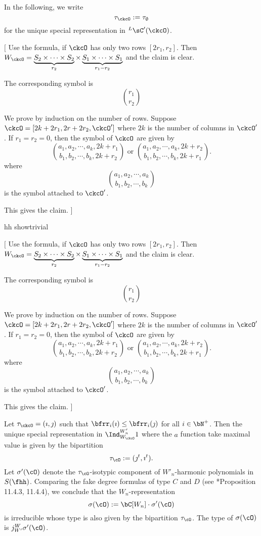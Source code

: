 \documentclass[12pt,a4paper]{amsart}
\newcommand{\trivial}[2][]{\if\relax\detokenize{#1}\relax
  {%
      \color{orange} \vspace{0em} $[$  #2 $]$
      \color{black}
  }
  \else
\ifx#1h
\ifcsname showtrivial\endcsname
{%
    \color{orange} \vspace{0em}  $[$ #2 $]$
    \color{black}
}
\fi
\else {\red Wrong argument!} \fi
\fi
}
\numberwithin{equation}{section}
\theoremstyle{remark}
\begin{document}
In the following, we write
\[
\tau_{\ckcO}:=\tau_\emptyset
\]
for the unique special
representation in $\LCC(\ckcO)$.

\trivial[h]{
 Use the formula, if $\ckcO$ has only two rows $[2r_1,r_2]$.
 Then $W_{\ckcO} = \underbrace{S_2\times \cdots \times S_2}_{r_2} \times
 \underbrace{ S_1 \times \cdots \times S_1}_{r_1-r_2}$ and the claim is clear.

 The corresponding symbol is
 \[
  \binom{r_1}{r_2}
 \]

 We prove by induction on the number of rows.
 Suppose $\ckcO  = [2k+2r_1, 2r+2r_2, \ckcO'] $ where $2k$ is the number of columns in $\ckcO'$.
 If $r_1=r_2 =0$, then
 the symbol of $\ckcO$ are given by
 \[
  \binom{a_1,a_2, \cdots, a_k, 2k+r_1}{b_1, b_2, \cdots, b_k, 2k+r_2 }
  \text{ or }
  \binom{a_1,a_2, \cdots, a_k, 2k+r_2}{b_1, b_2, \cdots, b_k, 2k+r_1 }.
 \]
where
\[
  \binom{a_1,a_2, \cdots, a_k}{b_1, b_2, \cdots, b_k}
\]
is the symbol attached to $\ckcO'$.

This gives the claim.
}


Let $\tau_\ckcO  = (\imath,\jmath)$ such that $\bfrr_i(\imath)\leq \bfrr_i(\jmath)$ for all $i\in \bN^+$.
Then the unique special representation
in $\Ind_{W_\ckcO}^{W'_n} 1$ where the $a$ function take maximal value is given
by the bipartition
\[
  \tau_{\cO}:=(\jmath^t,\imath^t).
\]
Let $\sigma'(\cO)$ denote the $\tau_{\cO}$-isotypic component of $W'_n$-harmonic polynomials in $S(\fhh)$.
Comparing the  fake degree formulas of type $C$ and $D$ (see \cite{Carter}*{Proposition 11.4.3, 11.4.4}), we conclude that
the $W_n$-representation
\begin{equation}\label{eq:sigma.tC}
\sigma(\cO):= \bC[W_n]\cdot \sigma'(\cO)
\end{equation}
is irreducible whose type is also given by the
bipartition $\tau_{\cO}$. The type of $\sigma(\cO)$ is $j_{W'}^{W} \sigma'(\cO)$.
\end{document}
